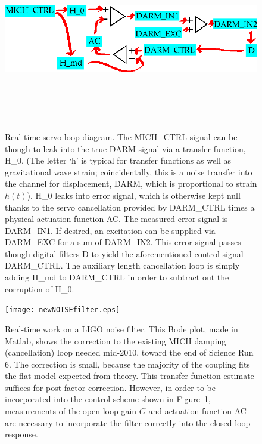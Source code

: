 	\begin{figure}
	\begin{center}
	\includegraphics[height=80mm, width=148mm]{servo_loop.eps}
	\caption{Real-time servo loop diagram. The MICH\_CTRL signal can be though to leak into the true DARM signal via a transfer function, H\_0. (The letter `h' is typical for transfer functions as well as gravitational wave strain; coincidentally, this is a noise transfer into the channel for displacement, DARM, which is proportional to strain $h(t)$). H\_0 leaks into error signal, which is otherwise kept null thanks to the servo cancellation provided by DARM\_CTRL times a physical actuation function AC. The measured error signal is DARM\_IN1. If desired, an excitation can be supplied via DARM\_EXC for a sum of DARM\_IN2. This error signal passes though digital filters D to yield the aforementioned control signal DARM\_CTRL. The auxiliary length cancellation loop is simply adding H\_md to DARM\_CTRL in order to subtract out the corruption of H\_0.}
	\label{servo_loop_realtime}
	\end{center}
	\end{figure}

	\begin{figure}
	\begin{center}
	\texttt{[image: newNOISEfilter.eps]}
	\caption{Real-time work on a LIGO noise filter. This Bode plot, made in Matlab, shows the correction to the existing MICH damping (cancellation) loop needed mid-2010, toward the end of Science Run 6. The correction is small, because the majority of the coupling fits the flat model expected from theory. This transfer function estimate suffices for post-factor correction. However, in order to be incorporated into the control scheme shown in Figure~\ref{servo_loop_realtime}, measurements of the open loop gain $G$ and actuation function AC are necessary to incorporate the filter correctly into the closed loop response.} 
	\label{newNOISEfilter}
	\end{center}
	\end{figure}

